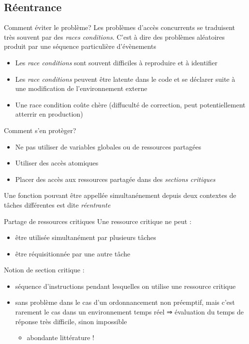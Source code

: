 \subsection{Réentrance}

\begin{frame}{Comment éviter le problème?}
  Les problèmes  d'accès concurrents se  traduisent très souvent  par des
  \emph{races  conditions}.  C'est  à  dire des  problèmes  aléatoires
  produit par une séquence particulière d'évènements
  \begin{itemize} 
  \item   Les  \emph{race  conditions}   sont  souvent   difficiles  à
    reproduire et à identifier
  \item Les  \emph{race conditions} peuvent être latente  dans le code
    et se déclarer suite à une modification de l'environnement externe
  \item Une race condition coûte chère (diffuculté de correction, peut
    potentiellement atterrir en production)
  \end{itemize} 
  Comment s'en protèger?
  \begin{itemize} 
  \item Ne pas utiliser de variables globales ou de ressources partagées
  \item Utiliser des accès atomiques
  \item  Placer des  accès aux  ressources partagée  dans  des \emph{sections
    critiques}
  \end{itemize} 
  Une  fonction  pouvant  être  appellée simultanénement  depuis  deux
  contextes de tâches différentes est dite \emph{réentrante}
\end{frame} 

\begin{frame}{Partage de ressources critiques} 
  Une ressource critique ne peut :
  \begin{itemize}
  \item être utilisée simultanément par plusieurs tâches
  \item être réquisitionnée par une autre tâche
  \end{itemize}
  Notion de section critique :
  \begin{itemize}
  \item  séquence  d'instructions pendant  lesquelles  on utilise  une
    ressource critique 
  \item sans  problème dans le cas d'un  ordonnancement non préemptif,
    mais  c'est rarement  le cas  dans un  environnement temps  réel ⇒
    évaluation du temps de réponse très difficile, sinon impossible
    \begin{itemize}
    \item abondante littérature ! 
    \end{itemize}
  \end{itemize}
\end{frame}

